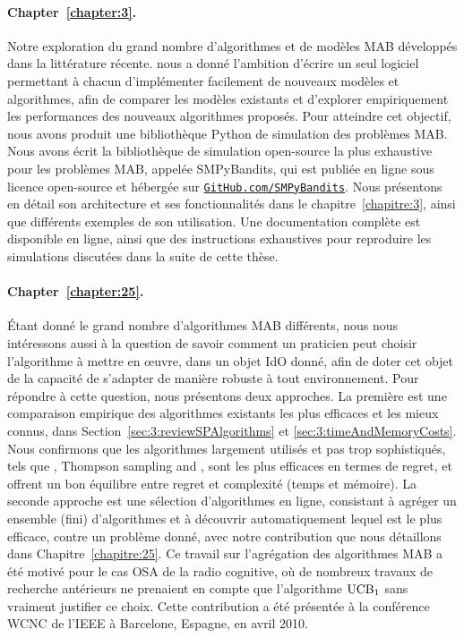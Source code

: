\begin{resume_fr}
\paragraph{Chapter~\ref{chapter:3}.}
%
Notre exploration du grand nombre d'algorithmes et de modèles MAB développés dans la littérature récente.
nous a donné l'ambition d'écrire un seul logiciel permettant à chacun d'implémenter facilement de nouveaux modèles et algorithmes, afin de comparer les modèles existants et d'explorer empiriquement les performances des nouveaux algorithmes proposés.
Pour atteindre cet objectif, nous avons produit une bibliothèque Python de simulation des problèmes MAB.
%
Nous avons écrit la bibliothèque de simulation open-source la plus exhaustive pour les problèmes MAB, appelée SMPyBandits, qui est publiée en ligne sous licence open-source \cite{SMPyBanditsJMLR,SMPyBandits} et hébergée sur \href{https://GitHub.com/SMPyBandits}{\texttt{GitHub.com/SMPyBandits}}.
Nous présentons en détail son architecture et ses fonctionnalités dans le chapitre~\ref{chapitre:3}, ainsi que différents exemples de son utilisation.
Une documentation complète est disponible en ligne, ainsi que des instructions exhaustives pour reproduire les simulations discutées dans la suite de cette thèse.


\paragraph{Chapter~\ref{chapter:25}.}
%
Étant donné le grand nombre d'algorithmes MAB différents, nous nous intéressons aussi à la question de savoir comment un praticien peut choisir l'algorithme à mettre en œuvre, dans un objet IdO donné, afin de doter cet objet de la capacité de s'adapter de manière robuste à tout environnement.
Pour répondre à cette question, nous présentons deux approches.
La première est une comparaison empirique des algorithmes existants les plus efficaces et les mieux connus, dans Section~\ref{sec:3:reviewSPAlgorithms} et \ref{sec:3:timeAndMemoryCosts}.
Nous confirmons que les algorithmes largement utilisés et pas trop sophistiqués, tels que \UCB{} \cite{Auer02}, Thompson sampling \cite{Thompson33} and \klUCB{} \cite{KLUCBJournal}, sont les plus efficaces en termes de regret, et offrent un bon équilibre entre regret et complexité (temps et mémoire).
La seconde approche est une sélection d'algorithmes en ligne, consistant à agréger un ensemble (fini) d'algorithmes et à découvrir automatiquement lequel est le plus efficace, contre un problème donné, avec notre contribution \Aggr{} que nous détaillons dans Chapitre~\ref{chapitre:25}.
Ce travail sur l'agrégation des algorithmes MAB a été motivé pour le cas OSA de la radio cognitive, où de nombreux travaux de recherche antérieurs ne prenaient en compte que l'algorithme $\mathrm{UCB}_1$ sans vraiment justifier ce choix.
Cette contribution a été présentée à la conférence WCNC de l'IEEE à Barcelone, Espagne, en avril 2010.



\end{resume_fr}

